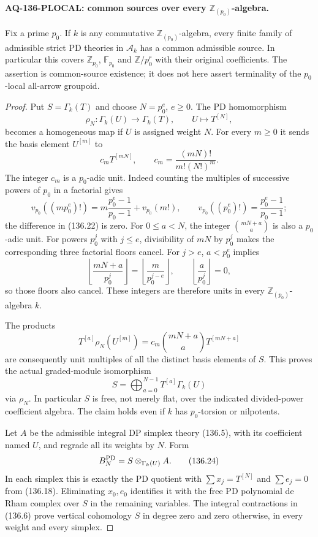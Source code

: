 \paragraph{AQ-136-PLOCAL: common sources over every $\mathbb Z_{(p_0)}$-algebra.}
Fix a prime $p_0$.  If $k$ is any commutative
$\mathbb Z_{(p_0)}$-algebra, every finite family of admissible
strict PD theories in $\mathcal A_k$ has a common admissible
source.  In particular this covers $\mathbb Z_{p_0}$,
$\mathbb F_{p_0}$ and $\mathbb Z/p_0^r$ with their original
coefficients.  The assertion is common-source existence;
it does not here assert terminality of the $p_0$-local
all-arrow groupoid.

\begin{proof}
Put $S=\Gamma_k(T)$ and choose $N=p_0^e$, $e\geq0$.
The PD homomorphism
\[
 \rho_N:\Gamma_k(U)\longrightarrow\Gamma_k(T),
                  \qquad U\longmapsto T^{[N]},              \tag{136.21}
\]
becomes a homogeneous map if $U$ is assigned weight $N$.
For every $m\geq0$ it sends the basis element $U^{[m]}$ to
\[
 c_mT^{[mN]},\qquad c_m=\frac{(mN)!}{m!(N!)^m}.
                                                               \tag{136.22}
\]
The integer $c_m$ is a $p_0$-adic unit.  Indeed counting the
multiples of successive powers of $p_0$ in a factorial gives
\[
 v_{p_0}((mp_0^e)!)
  =m\frac{p_0^e-1}{p_0-1}+v_{p_0}(m!),
 \qquad
 v_{p_0}((p_0^e)!)=\frac{p_0^e-1}{p_0-1};
\]
the difference in (136.22) is zero.
For $0\leq a<N$, the integer
$\binom{mN+a}{a}$ is also a $p_0$-adic unit.
For powers $p_0^j$ with $j\leq e$, divisibility of $mN$
by $p_0^j$ makes the corresponding three factorial floors
cancel.  For $j>e$, $a<p_0^e$ implies
\[
 \left\lfloor\frac{mN+a}{p_0^j}\right\rfloor
  =\left\lfloor\frac{m}{p_0^{j-e}}\right\rfloor,
 \qquad \left\lfloor\frac a{p_0^j}\right\rfloor=0,
\]
so those floors also cancel.  These integers are therefore
units in every $\mathbb Z_{(p_0)}$-algebra $k$.

The products
\[
 T^{[a]}\rho_N(U^{[m]})
    =c_m\binom{mN+a}{a}T^{[mN+a]}
\]
are consequently unit multiples of all the distinct basis
elements of $S$.  This proves the actual graded-module
isomorphism
\[
 S=\bigoplus_{a=0}^{N-1}T^{[a]}\Gamma_k(U)                 \tag{136.23}
\]
via $\rho_N$.  In particular $S$ is free, not merely flat,
over the indicated divided-power coefficient algebra.
The claim holds even if $k$ has $p_0$-torsion or nilpotents.

Let $A$ be the admissible integral DP simplex theory
(136.5), with its coefficient named $U$, and regrade
all its weights by $N$.  Form
\[
 B_N^{\rm PD}=S\otimes_{\Gamma_k(U)}A .                    \tag{136.24}
\]
In each simplex this is exactly the PD quotient with
$\sum x_j=T^{[N]}$ and $\sum e_j=0$ from (136.18).
Eliminating $x_0,e_0$ identifies it with the free PD
polynomial de Rham complex over $S$ in the remaining
variables.  The integral contractions in (136.6) prove
vertical cohomology $S$ in degree zero and zero otherwise,
in every weight and every simplex.


\end{proof}
